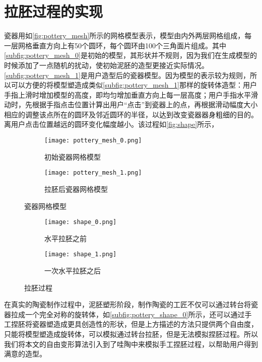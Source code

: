 \section{拉胚过程的实现}

瓷器用如\autoref{fig:pottery_mesh}所示的网格模型表示，模型由内外两层网格组成，每一层网格垂直方向上有50个圆环，每个圆环由100个三角面片组成。其中\autoref{subfig:pottery_mesh_0}是初始的模型，其形状并不规则，因为我们在生成模型的时候添加了一点随机的扰动，使初始泥胚的造型更接近实际情况。\autoref{subfig:pottery_mesh_1}是用户造型后的瓷器模型。因为模型的表示较为规则，所以可以方便的将模型塑造成类似\autoref{subfig:pottery_mesh_1}那样的旋转体造型：用户手指上滑时增加模型的高度，即均匀增加垂直方向上每一层高度；用户手指水平滑动时，先根据手指点击位置计算出用户“点击”到瓷器上的点，再根据滑动幅度大小相应的调整该点所在的圆环及邻近圆环的半径，以达到改变瓷器器身粗细的目的。离用户点击位置越远的圆环变化幅度越小。该过程如\autoref{fig:shape}所示，

\begin{figure}[htbp]
	\centering
	\begin{subfigure}[b]{.4\textwidth}
		\centering
	    \texttt{[image: pottery\_mesh\_0.png]}
		\caption{初始瓷器网格模型}\label{subfig:pottery_mesh_0}
	\end{subfigure}
	\begin{subfigure}[b]{.4\textwidth}
		\centering
		\texttt{[image: pottery\_mesh\_1.png]}
		\caption{拉胚后瓷器网格模型}\label{subfig:pottery_mesh_1}
	\end{subfigure}
	\caption{瓷器网格模型}\label{fig:pottery_mesh}
\end{figure}

\begin{figure}[htbp]
	\centering
	\begin{subfigure}[b]{.4\textwidth}
		\centering
	    \texttt{[image: shape\_0.png]}
		\caption{水平拉胚之前}\label{subfig:shape_0}
	\end{subfigure}
	\begin{subfigure}[b]{.4\textwidth}
		\centering
		\texttt{[image: shape\_1.png]}
		\caption{一次水平拉胚之后}\label{subfig:shape_1}
	\end{subfigure}
	\caption{拉胚过程}\label{fig:shape}
\end{figure}

在真实的陶瓷制作过程中，泥胚塑形阶段，制作陶瓷的工匠不仅可以通过转台将瓷器拉成一个完全对称的旋转体，如\autoref{subfig:pottery_shape_0}所示，还可以通过手工捏胚将瓷器塑造成更具创造性的形状，但是上方描述的方法只提供两个自由度，只能将模型塑造成旋转体，可以模拟通过转台拉胚，但是无法模拟捏胚过程。所以我们将本文的自由变形算法引入到了哇陶中来模拟手工捏胚过程，以帮助用户得到满意的造型。

